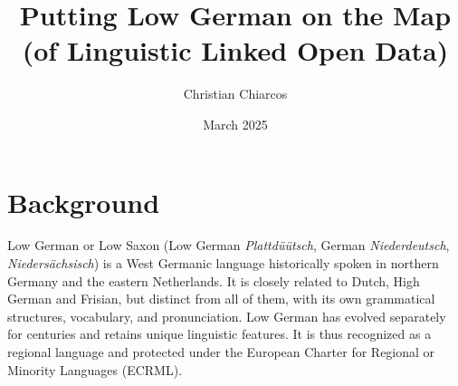 \documentclass{article}
\title{Putting Low German on the Map (of Linguistic Linked Open Data)}
\author{Christian Chiarcos}
\date{March 2025}
\newcommand{\word}[1]{\textsl{#1}}
\begin{document}
\maketitle

\section{Background}

Low German or Low Saxon (Low German \word{Plattdüütsch}, German \word{Niederdeutsch}, \word{Niedersächsisch}) is a West Germanic language historically spoken in northern Germany and the eastern Netherlands. It is closely related to Dutch, High German and Frisian, but distinct from all of them, with its own grammatical structures, vocabulary, and pronunciation. Low German has evolved separately for centuries and retains unique linguistic features. It is thus recognized as a regional language and protected under the European Charter for Regional or Minority Languages (ECRML). 
\end{document}
